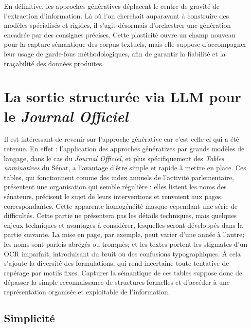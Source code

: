 En définitive, les approches génératives déplacent le centre de gravité de l’extraction d’information. Là où l’on cherchait auparavant à construire des modèles spécialisés et rigides, il s’agit désormais d’orchestrer une génération encadrée par des consignes précises. Cette plasticité ouvre un champ nouveau pour la capture sémantique des corpus textuels, mais elle suppose d’accompagner leur usage de garde-fous méthodologiques, afin de garantir la fiabilité et la traçabilité des données produites.

\section[La sortie structurée via LLM]{La sortie structurée via LLM pour le \emph{Journal Officiel}}

Il est intéressant de revenir sur l'approche générative car c'est celle-ci qui a été retenue. En effet : l’application des approches génératives par grands modèles de langage, dans le cas du \emph{Journal Officiel}, et plus spécifiquement des \emph{Tables nominatives} du Sénat, a l'avantage d'être simple et rapide à mettre en place. Ces tables, qui fonctionnent comme des index annuels de l’activité parlementaire, présentent une organisation qui semble régulière : elles listent les noms des sénateurs, précisent le sujet de leurs interventions et renvoient aux pages correspondantes. Cette apparente homogénéité masque cependant une série de difficultés. Cette partie ne présentera pas les détails techniques, mais quelques enjeux techniques et avantages à considérer, lesquelles seront développés dans la partie suivante. La mise en page, par exemple, peut varier d’une année à l’autre; les noms sont parfois abrégés ou tronqués; et les textes portent les stigmates d’un OCR imparfait, introduisant du bruit ou des confusions typographiques. À cela s’ajoute la diversité des formulations, qui rend incertaine toute tentative de repérage par motifs fixes. Capturer la sémantique de ces tables suppose donc de dépasser la simple reconnaissance de structures formelles et d’accéder à une représentation organisée et exploitable de l’information.

\subsection{Simplicité}

